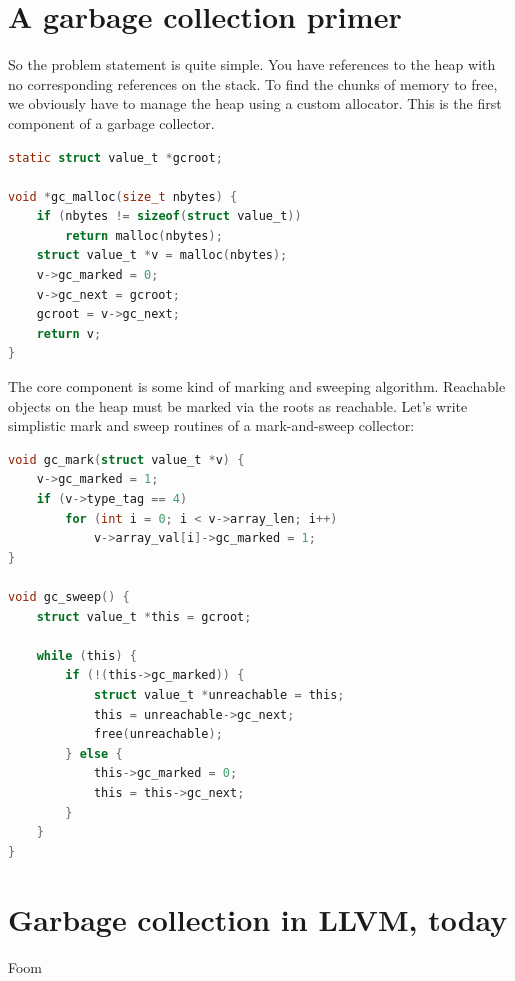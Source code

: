 \documentclass{article}
\begin{document}
\section{A garbage collection primer}
So the problem statement is quite simple. You have references to the
heap with no corresponding references on the stack. To find the chunks
of memory to free, we obviously have to manage the heap using a custom
allocator. This is the first component of a garbage collector.
\begin{lstlisting}[language=c]
static struct value_t *gcroot;

void *gc_malloc(size_t nbytes) {
	if (nbytes != sizeof(struct value_t))
		return malloc(nbytes);
	struct value_t *v = malloc(nbytes);
	v->gc_marked = 0;
	v->gc_next = gcroot;
	gcroot = v->gc_next;
	return v;
}
\end{lstlisting}
The core component is some kind of marking and sweeping
algorithm. Reachable objects on the heap must be marked via the roots
as reachable. Let's write simplistic mark and sweep routines of a
mark-and-sweep collector:
\begin{lstlisting}[language=c]
void gc_mark(struct value_t *v) {
	v->gc_marked = 1;
	if (v->type_tag == 4)
		for (int i = 0; i < v->array_len; i++)
			v->array_val[i]->gc_marked = 1;
}

void gc_sweep() {
	struct value_t *this = gcroot;

	while (this) {
		if (!(this->gc_marked)) {
			struct value_t *unreachable = this;
			this = unreachable->gc_next;
			free(unreachable);
		} else {
			this->gc_marked = 0;
			this = this->gc_next;
		}
	}
}
\end{lstlisting}

\section{Garbage collection in LLVM, today}
Foom
\end{document}
